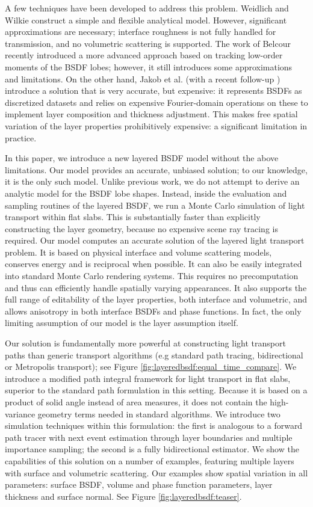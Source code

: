 A few techniques have been developed to address this problem. Weidlich and Wilkie \cite{weidlich2007arbitrarily} construct a simple and flexible analytical model. However, significant approximations are necessary; interface roughness is not fully handled for transmission, and no volumetric scattering is supported. The work of Belcour \cite{belcour2018efficient} recently introduced a more advanced approach based on tracking low-order moments of the BSDF lobes; however, it still introduces some approximations and limitations. On the other hand, Jakob et al. \cite{jakob2014comprehensive} (with a recent follow-up \cite{zeltner2018layer}) introduce a solution that is very accurate, but expensive: it represents BSDFs as discretized datasets and relies on expensive Fourier-domain operations on these to implement layer composition and thickness adjustment. This makes free spatial variation of the layer properties prohibitively expensive: a significant limitation in practice.

In this paper, we introduce a new layered BSDF model without the above limitations. Our model provides an accurate, unbiased solution; to our knowledge, it is the only such model.
Unlike previous work, we do not attempt to derive an analytic model for the BSDF lobe shapes. Instead, inside the evaluation and sampling routines of the layered BSDF, we run a Monte Carlo simulation of light transport within flat slabs.
This is substantially faster than explicitly constructing the layer geometry, because no expensive scene ray tracing is required.
Our model computes an accurate solution of the layered light transport problem.
It is based on physical interface and volume scattering models, conserves energy and is reciprocal when possible. It can also be easily integrated into standard Monte Carlo rendering systems.
This requires no precomputation and thus can efficiently handle spatially varying appearances. It also supports the full range of editability of the layer properties, both interface and volumetric, and allows anisotropy in both interface BSDFs and phase functions. In fact, the only limiting assumption of our model is the layer assumption itself.

Our solution is fundamentally more powerful at constructing light transport paths than generic transport algorithms (e.g standard path tracing, bidirectional or Metropolis transport); see Figure \ref{fig:layeredbsdf:equal_time_compare}. We introduce a modified path integral framework for light transport in flat slabs, superior to the standard path formulation in this setting. Because it is based on a product of solid angle instead of area measures, it does not contain the high-variance geometry terms needed in standard algorithms. We introduce two simulation techniques within this formulation: the first is analogous to a forward path tracer with next event estimation through layer boundaries and multiple importance sampling; the second is a fully bidirectional estimator. We show the capabilities of this solution on a number of examples, featuring multiple layers with surface and volumetric scattering. Our examples show spatial variation in all parameters: surface BSDF, volume and phase function parameters, layer thickness and surface normal. See Figure \ref{fig:layeredbsdf:teaser}.

